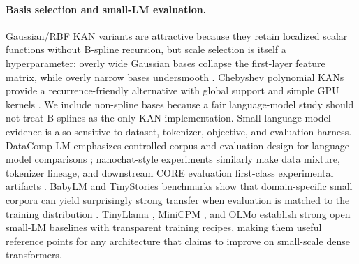 \documentclass[11pt]{article}
\begin{document}
\paragraph{Basis selection and small-LM evaluation.}
Gaussian/RBF KAN variants are attractive because they retain localized scalar functions without B-spline recursion, but scale selection is itself a hyperparameter: overly wide Gaussian bases collapse the first-layer feature matrix, while overly narrow bases undersmooth \cite{noorizadegan2026gaussian}. Chebyshev polynomial KANs provide a recurrence-friendly alternative with global support and simple GPU kernels \cite{sidharth2024chebyshev}. We include non-spline bases because a fair language-model study should not treat B-splines as the only KAN implementation. Small-language-model evidence is also sensitive to dataset, tokenizer, objective, and evaluation harness. DataComp-LM emphasizes controlled corpus and evaluation design for language-model comparisons \cite{li2024datacomp}; nanochat-style experiments similarly make data mixture, tokenizer lineage, and downstream CORE evaluation first-class experimental artifacts \cite{karpathy2025nanochat}. BabyLM and TinyStories benchmarks show that domain-specific small corpora can yield surprisingly strong transfer when evaluation is matched to the training distribution \cite{eldan2023tinystories,warstadt2023babylm}. TinyLlama \cite{zhang2024tinyllama}, MiniCPM \cite{hu2024minicpm}, and OLMo \cite{groeneveld2024olmo} establish strong open small-LM baselines with transparent training recipes, making them useful reference points for any architecture that claims to improve on small-scale dense transformers.
\end{document}
